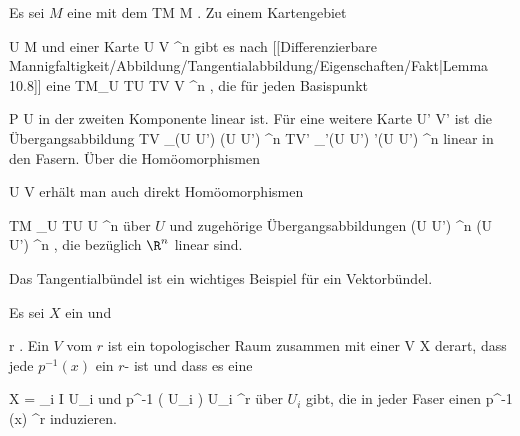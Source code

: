 \setcounter{section}{12}


Es sei $M$ eine
mit dem
 {TM} {M
} {.}
Zu einem Kartengebiet

\mavergleichskette
{\vergleichskette
{ U
}
{ \subseteq }{ M
}
{  }{
}
{    }{
}
{   }{
}
}
{}{}{}
und einer Karte
\maabbdisp {\alpha} { U } { V \subseteq \R^n
} {}
gibt es nach
[[Differenzierbare Mannigfaltigkeit/Abbildung/Tangentialabbildung/Eigenschaften/Fakt|Lemma 10.8]]
eine
 {TM\vert_U \cong TU} { TV \cong V \times \R^n
} {,}
die für jeden Basispunkt

\mavergleichskette
{\vergleichskette
{ P
}
{ \in }{ U
}
{  }{
}
{    }{
}
{   }{
}
}
{}{}{}
in der zweiten Komponente linear ist. Für eine weitere Karte
 {U'} {V'
} {}
ist die Übergangsabbildung
\maabbdisp {} {TV \vert_{\alpha(U \cap U') }  \cong \alpha(U \cap U') \times \R^n } { TV' \vert_{\alpha'(U \cap U') }  \cong \alpha'(U \cap U') \times \R^n
} {}
linear in den Fasern. Über die Homöomorphismen

\mavergleichskette
{\vergleichskette
{ U
}
{ \cong }{ V
}
{  }{
}
{    }{
}
{   }{
}
}
{}{}{}
erhält man auch direkt Homöomorphismen

\mavergleichskettedisp
{\vergleichskette
{ TM \vert_U \cong TU
}
{ \cong} { U \times \R^n
}
{ } {
}
{ } {
}
{ } {
}
}
{}{}{}
über $U$ und zugehörige Übergangsabbildungen
\maabbdisp {} {(U \cap U') \times \R^n } { (U \cap U') \times \R^n
} {,}
die bezüglich $\R^n$ linear sind.

Das Tangentialbündel ist ein wichtiges Beispiel für ein Vektorbündel.

{}
{

Es sei $X$ ein
und

\mavergleichskette
{\vergleichskette
{r
}
{ \in }{\N
}
{  }{
}
{    }{
}
{   }{
}
}
{}{}{.}
Ein
$V$ vom
$r$ ist ein topologischer Raum zusammen mit einer
 { V } { X
} {}
derart, dass jede
$p^{-1}(x)$ ein
$r$-
ist und dass es eine

\mavergleichskette
{\vergleichskette
{X
}
{ = }{ \bigcup_{i \in I} U_i
}
{  }{
}
{    }{
}
{   }{
}
}
{}{}{}
und
 {p^{-1} \left(  U_i  \right) } { U_i \times \R^r
} {}
über $U_i$ gibt, die in jeder Faser einen
 {p^{-1} (x) } { \R^r
} {}
induzieren.

}

